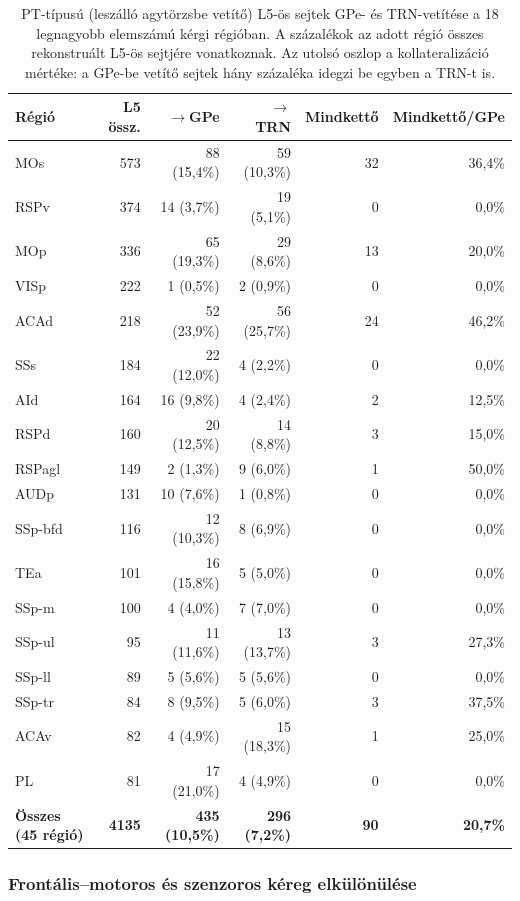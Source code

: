 \begin{table}[ht]
\centering
\caption{PT-típusú (leszálló agytörzsbe vetítő) L5-ös sejtek GPe- és
TRN-vetítése a 18 legnagyobb elemszámú kérgi régióban. A százalékok az adott
régió összes rekonstruált L5-ös sejtjére vonatkoznak. Az utolsó oszlop a
kollateralizáció mértéke: a GPe-be vetítő sejtek hány százaléka idegzi be
egyben a TRN-t is.}
\label{tab:pt_regiok}
\begin{tabular}{lrrrrr}
\hline
Régió & L5 össz. & $\rightarrow$GPe & $\rightarrow$TRN & Mindkettő & Mindkettő/GPe \\
\hline
MOs & 573 & 88 (15,4\%) & 59 (10,3\%) & 32 & 36,4\% \\
RSPv & 374 & 14 (3,7\%) & 19 (5,1\%) & 0 & 0,0\% \\
MOp & 336 & 65 (19,3\%) & 29 (8,6\%) & 13 & 20,0\% \\
VISp & 222 & 1 (0,5\%) & 2 (0,9\%) & 0 & 0,0\% \\
ACAd & 218 & 52 (23,9\%) & 56 (25,7\%) & 24 & 46,2\% \\
SSs & 184 & 22 (12,0\%) & 4 (2,2\%) & 0 & 0,0\% \\
AId & 164 & 16 (9,8\%) & 4 (2,4\%) & 2 & 12,5\% \\
RSPd & 160 & 20 (12,5\%) & 14 (8,8\%) & 3 & 15,0\% \\
RSPagl & 149 & 2 (1,3\%) & 9 (6,0\%) & 1 & 50,0\% \\
AUDp & 131 & 10 (7,6\%) & 1 (0,8\%) & 0 & 0,0\% \\
SSp-bfd & 116 & 12 (10,3\%) & 8 (6,9\%) & 0 & 0,0\% \\
TEa & 101 & 16 (15,8\%) & 5 (5,0\%) & 0 & 0,0\% \\
SSp-m & 100 & 4 (4,0\%) & 7 (7,0\%) & 0 & 0,0\% \\
SSp-ul & 95 & 11 (11,6\%) & 13 (13,7\%) & 3 & 27,3\% \\
SSp-ll & 89 & 5 (5,6\%) & 5 (5,6\%) & 0 & 0,0\% \\
SSp-tr & 84 & 8 (9,5\%) & 5 (6,0\%) & 3 & 37,5\% \\
ACAv & 82 & 4 (4,9\%) & 15 (18,3\%) & 1 & 25,0\% \\
PL & 81 & 17 (21,0\%) & 4 (4,9\%) & 0 & 0,0\% \\
\hline
\textbf{Összes (45 régió)} & \textbf{4135} & \textbf{435 (10,5\%)} &
\textbf{296 (7,2\%)} & \textbf{90} & \textbf{20,7\%} \\
\hline
\end{tabular}
\end{table}

\subsubsection{Frontális--motoros és szenzoros kéreg elkülönülése}

